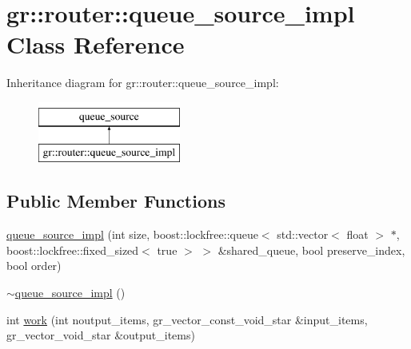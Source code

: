 \hypertarget{classgr_1_1router_1_1queue__source__impl}{\section{gr\+:\+:router\+:\+:queue\+\_\+source\+\_\+impl Class Reference}
\label{classgr_1_1router_1_1queue__source__impl}
}
Inheritance diagram for gr\+:\+:router\+:\+:queue\+\_\+source\+\_\+impl\+:\begin{figure}[H]
\begin{center}
\leavevmode
\includegraphics[height=2.000000cm]{classgr_1_1router_1_1queue__source__impl}
\end{center}
\end{figure}
\subsection*{Public Member Functions}
\begin{DoxyCompactItemize}
\item 
\hyperlink{classgr_1_1router_1_1queue__source__impl_a891c6664d0a1fda398cf66ea7e07fe1f}{queue\+\_\+source\+\_\+impl} (int size, boost\+::lockfree\+::queue$<$ std\+::vector$<$ float $>$ $\ast$, boost\+::lockfree\+::fixed\+\_\+sized$<$ true $>$ $>$ \&shared\+\_\+queue, bool preserve\+\_\+index, bool order)
\item 
\hyperlink{classgr_1_1router_1_1queue__source__impl_ac993c8ac719506456eb47ccf2016f5f0}{$\sim$queue\+\_\+source\+\_\+impl} ()
\item 
int \hyperlink{classgr_1_1router_1_1queue__source__impl_aecffa04879229acce72eb52da24dbfba}{work} (int noutput\+\_\+items, gr\+\_\+vector\+\_\+const\+\_\+void\+\_\+star \&input\+\_\+items, gr\+\_\+vector\+\_\+void\+\_\+star \&output\+\_\+items)
\end{DoxyCompactItemize}


